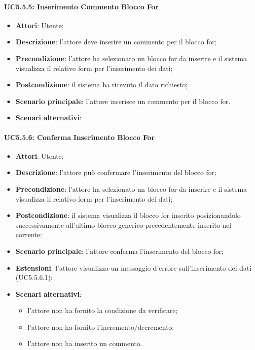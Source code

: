 \paragraph{UC5.5.5: Inserimento Commento Blocco For	}
\label{UC5.5.5}
\begin{itemize}
\item \textbf{Attori}: Utente;
\item \textbf{Descrizione}: l'attore deve inserire un commento per il blocco for;	
\item \textbf{Precondizione}: l'attore ha selezionato un blocco for da inserire e il sistema visualizza il relativo form per l'inserimento dei dati;	
\item \textbf{Postcondizione}: il sistema ha ricevuto il dato richiesto;	
\item \textbf{Scenario principale}:
l'attore inserisce un commento per il blocco for.	
\item \textbf{Scenari alternativi}:
\end{itemize}

\paragraph{UC5.5.6: Conferma Inserimento Blocco For}
\label{UC5.5.6}
\begin{itemize}
\item \textbf{Attori}: Utente;
\item \textbf{Descrizione}: l'attore può confermare l'inserimento del blocco for;	
\item \textbf{Precondizione}: l'attore ha selezionato un blocco for da inserire e il sistema visualizza il relativo form per l'inserimento dei dati;	
\item \textbf{Postcondizione}: il sistema visualizza il blocco for inserito posizionandolo successivamente all'ultimo blocco generico precedentemente inserito nel  corrente;
\item \textbf{Scenario principale}:
l'attore conferma l'inserimento del blocco for;	
\item \textbf{Estensioni}:
l'attore visualizza un messaggio d'errore sull'inserimento dei dati (UC5.5.6.1);	
\item \textbf{Scenari alternativi}:
\begin{itemize}
\item l'attore non ha fornito la condizione da verificare;
\item l'attore non ha fornito l'incremento/decremento;
\item l'attore non ha inserito un commento.
\end{itemize}
\end{itemize}

